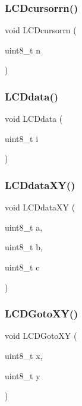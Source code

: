 \subsubsection{L\+C\+Dcursorrn()}
{\footnotesize\ttfamily void L\+C\+Dcursorrn (\begin{DoxyParamCaption}\item[{uint8\+\_\+t}]{n }\end{DoxyParamCaption})}

\mbox{\label{lcd_8c_af568f776dbe6ae59d5a3a0740a076167}} 
\subsubsection{L\+C\+Ddata()}
{\footnotesize\ttfamily void L\+C\+Ddata (\begin{DoxyParamCaption}\item[{uint8\+\_\+t}]{i }\end{DoxyParamCaption})}

\mbox{\label{lcd_8c_a2da84edd8d040ca17ce144de59c86c94}} 
\subsubsection{L\+C\+Ddata\+X\+Y()}
{\footnotesize\ttfamily void L\+C\+Ddata\+XY (\begin{DoxyParamCaption}\item[{uint8\+\_\+t}]{a,  }\item[{uint8\+\_\+t}]{b,  }\item[{uint8\+\_\+t}]{c }\end{DoxyParamCaption})}

\mbox{\label{lcd_8c_afc5417c0ac0c31211937f0fed389895b}} 
\subsubsection{L\+C\+D\+Goto\+X\+Y()}
{\footnotesize\ttfamily void L\+C\+D\+Goto\+XY (\begin{DoxyParamCaption}\item[{uint8\+\_\+t}]{x,  }\item[{uint8\+\_\+t}]{y }\end{DoxyParamCaption})}


